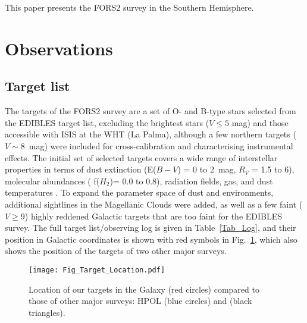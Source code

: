 \documentclass[a4paper]{aa}
\begin{document}
This paper presents the FORS2 survey in the Southern Hemisphere.


\section{Observations}\label{sec:obs}

\subsection{Target list}

The targets of the FORS2 survey are a set of O- and B-type stars selected from the EDIBLES target
list, excluding the brightest stars ($V \leq 5$ mag) and those
accessible with ISIS at the WHT (La Palma), although a few northern
targets ($V \sim 8$~mag) were included for cross-calibration and
characterising instrumental effects.  The
initial set of selected targets covers a wide range of interstellar
properties in terms of dust extinction (E($B-V$) = 0 to 2~mag, $R_V$ =
1.5 to 6), molecular abundances ( f($H_2$)= 0.0 to 0.8), radiation
fields, gas, and dust temperatures \citep{Coxetal17}.  To
expand the parameter space of dust and environments, additional
sightlines in the Magellanic Clouds were added, as well as a few faint
($V \geq 9$) highly reddened Galactic targets that are too faint for
the EDIBLES survey.  The full target list/observing log is given in
Table~\ref{Tab_Log}, and their position in Galactic coordinates is
shown with red symbols in Fig.~\ref{Fig_Coordinates}, which also
shows the position of the targets of two other major surveys.
\begin{figure}
  \texttt{[image: Fig\_Target\_Location.pdf]}
  \caption{\label{Fig_Coordinates} Location of our targets in the Galaxy (red circles)
    compared to those of other major surveys: HPOL (blue circles) and \citet{Whietal92}
  (black triangles).}
\end{figure}
\end{document}
